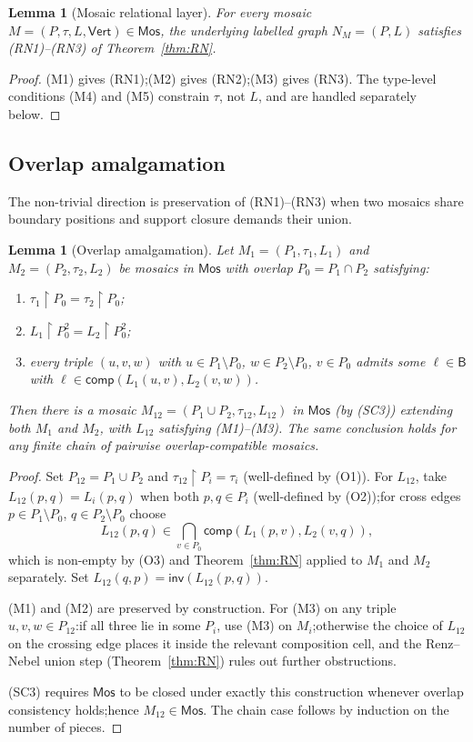 \documentclass[11pt]{article}
\newtheorem{lemma}[theorem]{Lemma}
\newcommand{\Base}{\mathsf{B}}
\newcommand{\Inv}{\mathsf{inv}}
\newcommand{\comp}{\mathsf{comp}}
\newcommand{\Mos}{\mathsf{Mos}}
\newcommand{\Vrt}{\mathsf{Vert}}
\begin{document}
\begin{lemma}[Mosaic relational layer]\label{lem:M-to-RN}
For every mosaic $M=(P,\tau,L,\Vrt)\in\Mos$, the underlying labelled
graph $N_M=(P,L)$ satisfies (RN1)--(RN3) of
Theorem~\ref{thm:RN}.
\end{lemma}

\begin{proof}
(M1) gives (RN1);\@ (M2) gives (RN2);\@ (M3) gives (RN3).  The
type-level conditions (M4) and (M5) constrain $\tau$, not $L$, and
are handled separately below.
\end{proof}

\subsection{Overlap amalgamation}
\label{ssec:overlap}

The non-trivial direction is preservation of (RN1)--(RN3) when two
mosaics share boundary positions and support closure demands their
union.

\begin{lemma}[Overlap amalgamation]\label{lem:overlap}
Let $M_1=(P_1,\tau_1,L_1)$ and $M_2=(P_2,\tau_2,L_2)$ be mosaics in
$\Mos$ with overlap $P_0=P_1\cap P_2$ satisfying:
\begin{enumerate}[label=\textnormal{(O\arabic*)},leftmargin=3em]
  \item $\tau_1\restriction P_0=\tau_2\restriction P_0$;
  \item $L_1\restriction P_0^2=L_2\restriction P_0^2$;
  \item every triple $(u,v,w)$ with $u\in P_1\setminus P_0$,
    $w\in P_2\setminus P_0$, $v\in P_0$ admits some
    $\ell\in\Base$ with $\ell\in\comp(L_1(u,v),L_2(v,w))$.
\end{enumerate}
Then there is a mosaic $M_{12}=(P_1\cup P_2,\tau_{12},L_{12})$ in
$\Mos$ (by (SC3)) extending both $M_1$ and $M_2$, with $L_{12}$
satisfying (M1)--(M3).  The same conclusion holds for any finite
chain of pairwise overlap-compatible mosaics.
\end{lemma}

\begin{proof}
Set $P_{12}=P_1\cup P_2$ and
$\tau_{12}\restriction P_i=\tau_i$ (well-defined by (O1)).  For
$L_{12}$, take $L_{12}(p,q)=L_i(p,q)$ when both $p,q\in P_i$
(well-defined by (O2));\@ for cross edges $p\in P_1\setminus P_0$,
$q\in P_2\setminus P_0$ choose
\[
  L_{12}(p,q)\in\bigcap_{v\in P_0}\comp(L_1(p,v),L_2(v,q)),
\]
which is non-empty by (O3) and Theorem~\ref{thm:RN} applied to
$M_1$ and $M_2$ separately.  Set $L_{12}(q,p)=\Inv(L_{12}(p,q))$.

(M1) and (M2) are preserved by construction.  For (M3) on any triple
$u,v,w\in P_{12}$:\@ if all three lie in some $P_i$, use (M3) on
$M_i$;\@ otherwise the choice of $L_{12}$ on the crossing edge places
it inside the relevant composition cell, and the Renz--Nebel union
step (Theorem~\ref{thm:RN}) rules out further obstructions.

(SC3) requires $\Mos$ to be closed under exactly this construction
whenever overlap consistency holds;\@ hence $M_{12}\in\Mos$.  The
chain case follows by induction on the number of pieces.
\end{proof}
\end{document}
